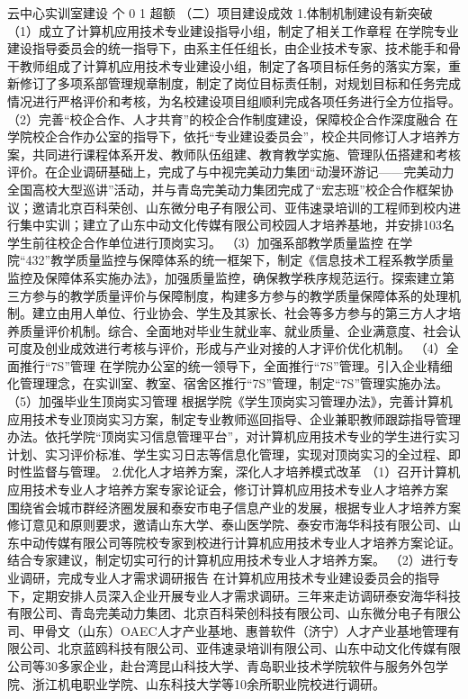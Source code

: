 云中心实训室建设
个
0
1
超额
（二）项目建设成效
1.体制机制建设有新突破
（1）成立了计算机应用技术专业建设指导小组，制定了相关工作章程
在学院专业建设指导委员会的统一指导下，由系主任任组长，由企业技术专家、技术能手和骨干教师组成了计算机应用技术专业建设小组，制定了各项目标任务的落实方案，重新修订了多项系部管理规章制度，制定了岗位目标责任制，对规划目标和任务完成情况进行严格评价和考核，为名校建设项目组顺利完成各项任务进行全方位指导。
（2）完善“校企合作、人才共育”的校企合作制度建设，保障校企合作深度融合
在学院校企合作办公室的指导下，依托“专业建设委员会”，校企共同修订人才培养方案，共同进行课程体系开发、教师队伍组建、教育教学实施、管理队伍搭建和考核评价。在企业调研基础上，完成了与中视完美动力集团“动漫环游记——完美动力全国高校大型巡讲”活动，并与青岛完美动力集团完成了“宏志班”校企合作框架协议；邀请北京百科荣创、山东微分电子有限公司、亚伟速录培训的工程师到校内进行集中实训；建立了山东中动文化传媒有限公司校园人才培养基地，并安排103名学生前往校企合作单位进行顶岗实习。
（3）加强系部教学质量监控
在学院“432”教学质量监控与保障体系的统一框架下，制定《信息技术工程系教学质量监控及保障体系实施办法》，加强质量监控，确保教学秩序规范运行。探索建立第三方参与的教学质量评价与保障制度，构建多方参与的教学质量保障体系的处理机制。建立由用人单位、行业协会、学生及其家长、社会等多方参与的第三方人才培养质量评价机制。综合、全面地对毕业生就业率、就业质量、企业满意度、社会认可度及创业成效进行考核与评价，形成与产业对接的人才评价优化机制。
（4）全面推行“7S”管理
在学院办公室的统一领导下，全面推行“7S”管理。引入企业精细化管理理念，在实训室、教室、宿舍区推行“7S”管理，制定“7S”管理实施办法。
（5）加强毕业生顶岗实习管理
根据学院《学生顶岗实习管理办法》，完善计算机应用技术专业顶岗实习方案，制定专业教师巡回指导、企业兼职教师跟踪指导管理办法。依托学院“顶岗实习信息管理平台”，对计算机应用技术专业的学生进行实习计划、实习评价标准、学生实习日志等信息化管理，实现对顶岗实习的全过程、即时性监督与管理。
2.优化人才培养方案，深化人才培养模式改革
（1）召开计算机应用技术专业人才培养方案专家论证会，修订计算机应用技术专业人才培养方案
围绕省会城市群经济圈发展和泰安市电子信息产业的发展，根据专业人才培养方案修订意见和原则要求，邀请山东大学、泰山医学院、泰安市海华科技有限公司、山东中动传媒有限公司等院校专家到校进行计算机应用技术专业人才培养方案论证。结合专家建议，制定切实可行的计算机应用技术专业人才培养方案。
（2）进行专业调研，完成专业人才需求调研报告
在计算机应用技术专业建设委员会的指导下，定期安排人员深入企业开展专业人才需求调研。三年来走访调研泰安海华科技有限公司、青岛完美动力集团、北京百科荣创科技有限公司、山东微分电子有限公司、甲骨文（山东）OAEC人才产业基地、惠普软件（济宁）人才产业基地管理有限公司、北京蓝鸥科技有限公司、亚伟速录培训有限公司、山东中动文化传媒有限公司等30多家企业，赴台湾昆山科技大学、青岛职业技术学院软件与服务外包学院、浙江机电职业学院、山东科技大学等10余所职业院校进行调研。
